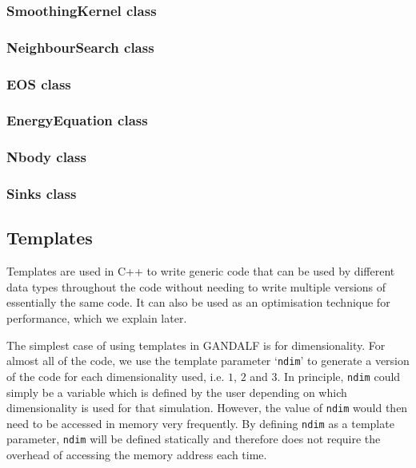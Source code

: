 \documentclass[a4paper]{article}
\newcommand{\var}[1]{\texttt{#1}}
\begin{document}
\subsubsection{SmoothingKernel class}

\subsubsection{NeighbourSearch class}

\subsubsection{EOS class}

\subsubsection{EnergyEquation class}

\subsubsection{Nbody class}

\subsubsection{Sinks class}



\subsection{Templates}
Templates are used in C++ to write generic code that can be used by different data types throughout the code without needing to write multiple versions of essentially the same code.  It can also be used as an optimisation technique for performance, which we explain later.

The simplest case of using templates in GANDALF is for dimensionality.  For almost all of the code, we use the template parameter `\var{ndim}' to generate a version of the code for each dimensionality used, i.e. $1$, $2$ and $3$.  In principle, \var{ndim} could simply be a variable which is defined by the user depending on which dimensionality is used for that simulation.  However, the value of \var{ndim} would then need to be accessed in memory very frequently.  By defining \var{ndim} as a template parameter, \var{ndim} will be defined statically and therefore does not require the overhead of accessing the memory address each time.
\end{document}
